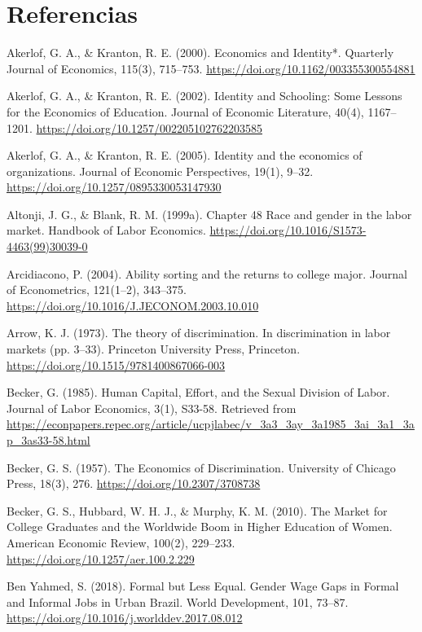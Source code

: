 \section*{Referencias}
\begingroup
\noindent
\setlength{\parindent}{-0.5in}
\setlength{\leftskip}{0.5in}

Akerlof, G. A., \& Kranton, R. E. (2000). Economics and Identity*. Quarterly Journal of Economics, 115(3), 715–753. \url{https://doi.org/10.1162/003355300554881}

Akerlof, G. A., \& Kranton, R. E. (2002). Identity and Schooling: Some Lessons for the Economics of Education. Journal of Economic Literature, 40(4), 1167–1201. \url{https://doi.org/10.1257/002205102762203585}

Akerlof, G. A., \& Kranton, R. E. (2005). Identity and the economics of organizations. Journal of Economic Perspectives, 19(1), 9–32. \url{https://doi.org/10.1257/0895330053147930}

Altonji, J. G., \& Blank, R. M. (1999a). Chapter 48 Race and gender in the labor market. Handbook of Labor Economics. \url{https://doi.org/10.1016/S1573-4463(99)30039-0}

Arcidiacono, P. (2004). Ability sorting and the returns to college major. Journal of Econometrics, 121(1–2), 343–375. \url{https://doi.org/10.1016/J.JECONOM.2003.10.010}

Arrow, K. J. (1973). The theory of discrimination. In discrimination in labor markets (pp. 3–33). Princeton University Press, Princeton. \url{https://doi.org/10.1515/9781400867066-003}

Becker, G. (1985). Human Capital, Effort, and the Sexual Division of Labor. Journal of Labor Economics, 3(1), S33-58. Retrieved from \url{https://econpapers.repec.org/article/ucpjlabec/v\_3a3\_3ay\_3a1985\_3ai\_3a1\_3ap\_3as33-58.html}

Becker, G. S. (1957). The Economics of Discrimination. University of Chicago Press, 18(3), 276. \url{https://doi.org/10.2307/3708738}

Becker, G. S., Hubbard, W. H. J., \& Murphy, K. M. (2010). The Market for College Graduates and the Worldwide Boom in Higher Education of Women. American Economic Review, 100(2), 229–233. \url{https://doi.org/10.1257/aer.100.2.229}

Ben Yahmed, S. (2018). Formal but Less Equal. Gender Wage Gaps in Formal and Informal Jobs in Urban Brazil. World Development, 101, 73–87. \url{https://doi.org/10.1016/j.worlddev.2017.08.012}

